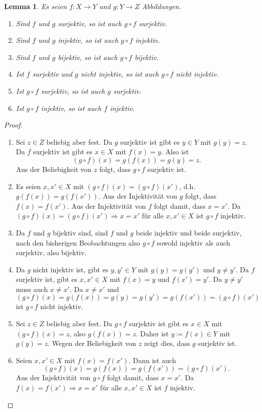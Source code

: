 \documentclass[a4paper,10pt]{article}
\newcounter{propositions}
\newtheorem{lem}[propositions]{Lemma}
\theoremstyle{definition}
\begin{document}
\begin{lem}
 Es seien $f \colon X \to Y$ und $g \colon Y \to Z$ Abbildungen.
 \begin{enumerate}[label=\arabic*), leftmargin=*]
  \item
   Sind $f$ und $g$ surjektiv, so ist auch $g \circ f$ surjektiv.
  \item
   Sind $f$ und $g$ injektiv, so ist auch $g \circ f$ injektiv.
  \item
   Sind $f$ und $g$ bijektiv, so ist auch $g \circ f$ bijektiv.
  \item
   Ist $f$ surjektiv und $g$ nicht injektiv, so ist auch $g \circ f$ nicht injektiv.
  \item
   Ist $g \circ f$ surjektiv, so ist auch $g$ surjektiv.
  \item
   Ist $g \circ f$ injektiv, so ist auch $f$ injektiv.
 \end{enumerate}
\end{lem}
\begin{proof}
 \begin{enumerate}[label=\arabic*), leftmargin=*]
  \item
   Sei $z \in Z$ beliebig aber fest. Da $g$ surjektiv ist gibt es $y \in Y$ mit $g(y) = z$. Da $f$ surjektiv ist gibt es $x \in X$ mit $f(x) = y$. Also ist
   \[
    (g \circ f)(x) = g(f(x)) = g(y) = z.
   \]
   Aus der Beliebigkeit von $z$ folgt, dass $g \circ f$ surjektiv ist.
  \item
   Es seien $x, x' \in X$ mit $(g \circ f)(x) = (g \circ f)(x')$, d.h.\ $g(f(x)) = g(f(x'))$. Aus der Injektivität von $g$ folgt, dass $f(x) = f(x')$. Aus der Injektivität von $f$ folgt damit, dass $x = x'$. Da $(g \circ f)(x) = (g \circ f)(x') \Rightarrow x = x'$ für alle $x, x' \in X$ ist $g \circ f$ injektiv.
  \item
   Da $f$ und $g$ bijektiv sind, sind $f$ und $g$ beide injektiv und beide surjektiv, nach den bisherigen Beobachtungen also $g \circ f$ sowohl injektiv als auch surjektiv, also bijektiv.
  \item
   Da $g$ nicht injektiv ist, gibt es $y, y' \in Y$ mit $g(y) = g(y')$ und $y \neq y'$. Da $f$ surjektiv ist, gibt es $x, x' \in X$ mit $f(x) = y$ und $f(x') = y'$. Da $y \neq y'$ muss auch $x \neq x'$. Da $x \neq x'$ und
   \[
    (g \circ f)(x) = g(f(x)) = g(y) = g(y') = g(f(x')) = (g \circ f)(x')
   \]
   ist $g \circ f$ nicht injektiv.
  \item
   Sei $z \in Z$ beliebig aber fest. Da $g \circ f$ surjektiv ist gibt es $x \in X$ mit $(g \circ f)(x) = z$, also $g(f(x)) = z$. Daher ist $y \coloneqq f(x) \in Y$ mit $g(y) = z$. Wegen der Beliebigkeit von $z$ zeigt dies, dass $g$ surjektiv ist.
  \item
   Seien $x, x' \in X$ mit $f(x) = f(x')$. Dann ist auch
   \[
    (g \circ f)(x) = g(f(x)) = g(f(x')) = (g \circ f)(x').
   \]
   Aus der Injektivität von $g \circ f$ folgt damit, dass $x = x'$. Da $f(x) = f(x') \Rightarrow x = x'$ für alle $x, x' \in X$ ist $f$ injektiv.
  \qedhere
 \end{enumerate}
\end{proof}
\end{document}
